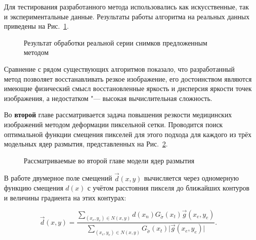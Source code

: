 Для тестирования разработанного метода использовались как искусственные, так и экспериментальные данные. Результаты работы алгоритма на реальных данных приведены на Рис.~\ref{fig:sinopsis-blinking}.

\begin{figure}[ht]
	\caption{Результат обработки реальной серии снимков предложенным методом}
	\label{fig:sinopsis-blinking}
\end{figure}

Сравнение с рядом существующих алгоритмов показало, что разработанный метод позволяет восстанавливать резкое изображение, его достоинством являются имеющие физический смысл восстановленные яркость и дисперсия яркости точек изображения, а недостатком "--- высокая вычислительная сложность.


Во {\textbf{второй}} главе рассматривается задача повышения резкости медицинских изображений методом деформации пиксельной сетки. Проводится поиск оптимальной функции смещения пикселей для этого подхода для каждого из трёх модельных ядер размытия, представленных на Рис.~\ref{fig:sinopsis-warping-blur}.

\begin{figure}[ht]
	\caption{Рассматриваемые во второй главе модели ядер размытия}
	\label{fig:sinopsis-warping-blur}
\end{figure}

В работе двумерное поле смещений $\vec{d}\left(x,y\right)$ вычисляется через одномерную функцию смещения $d\left(x\right)$ с учётом расстояния пикселя до ближайших контуров и величины градиента на этих контурах:

\begin{equation*}
	\vec{d}\left(x,y\right) = \frac{\sum_{\left(x_e,y_e\right) \in N\left(x,y\right)}{d\left(x_n\right) G_{\widetilde{\sigma}}\left(x_t\right) \vec{g}\left(x_e,y_e\right) }} {\sum_{\left(x_e,y_e\right) \in N\left(x,y\right)}{G_{\widetilde{\sigma}}\left(x_t\right)\lvert \vec{g}\left(x_e,y_e\right) \rvert}}.
\end{equation*}

